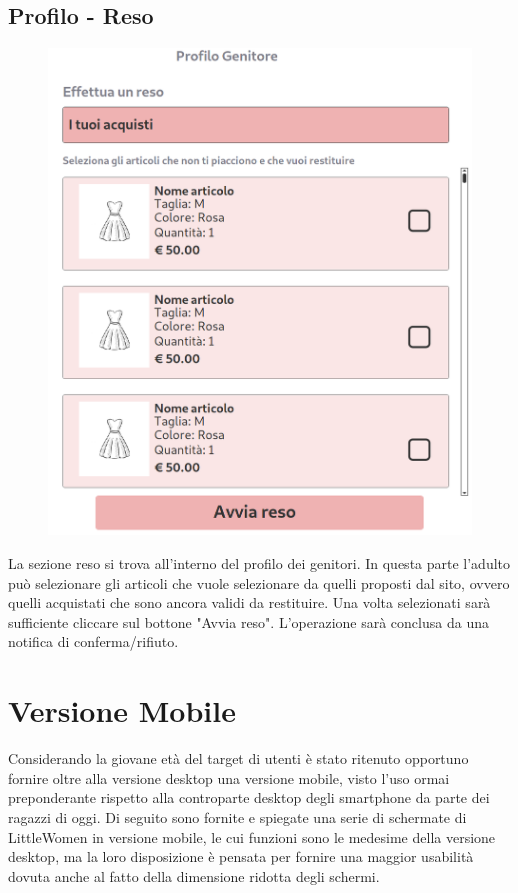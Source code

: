 \documentclass[12pt,a4paper]{report}
\begin{document}
\subsection{Profilo - Reso}
\begin{figure}
\includegraphics[height=0.50\textheight]{"Images Latex/Immagini Wireframe/Desktop/17 - Profilo Reso"}
\vspace{-110pt}
\end{figure}

 La sezione reso si trova all'interno del profilo dei genitori. In questa parte l'adulto può selezionare gli articoli che vuole selezionare da quelli proposti dal sito, ovvero quelli acquistati che sono ancora validi da restituire. Una volta selezionati sarà sufficiente cliccare sul bottone "Avvia reso". L'operazione sarà conclusa da una notifica di conferma/rifiuto.
\newpage
\section{Versione Mobile}
Considerando la giovane età del target di utenti è stato ritenuto opportuno fornire oltre alla versione desktop una versione mobile, visto l'uso ormai preponderante rispetto alla controparte desktop degli smartphone da parte dei ragazzi di oggi. Di seguito sono fornite e spiegate una serie di schermate di LittleWomen in versione mobile, le cui funzioni sono le medesime della versione desktop, ma la loro disposizione è pensata per fornire una maggior usabilità dovuta anche al fatto della dimensione ridotta degli schermi.
\newpage
\end{document}
